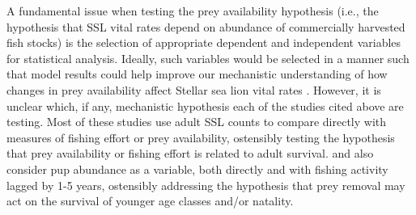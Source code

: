 \documentclass[nonumbib,leqno]{nrc1}
\begin{document}
A fundamental issue when testing the prey availability hypothesis (i.e., the hypothesis that SSL vital rates depend on abundance of commercially harvested fish stocks) is the selection of appropriate dependent and independent variables for statistical analysis.  Ideally, such variables would be selected in a manner such that model results could help improve our mechanistic understanding of how changes in prey availability affect Stellar sea lion vital rates \citep{FayPunt2006,Wolf:2008qf}. However, it is unclear which, if any, mechanistic hypothesis each of the studies cited above are testing.  Most of these studies use adult SSL counts to compare directly with measures of fishing effort or prey availability, ostensibly testing the hypothesis that prey availability or fishing effort is related to adult survival. \citet{Loughlin:1989kl} and \citet{Ferrero:1994hc} also consider pup abundance as a variable, both directly and with fishing activity lagged by 1-5 years, ostensibly addressing the hypothesis that prey removal may act on the survival of younger age classes and/or natality.
\end{document}
